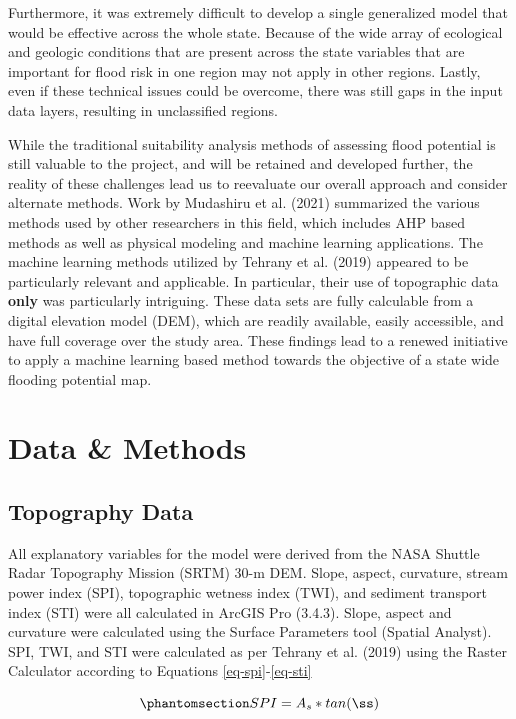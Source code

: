\documentclass[
]{agujournal2019}
\begin{document}
Furthermore, it was extremely difficult to develop a single generalized
model that would be effective across the whole state. Because of the
wide array of ecological and geologic conditions that are present across
the state variables that are important for flood risk in one region may
not apply in other regions. Lastly, even if these technical issues could
be overcome, there was still gaps in the input data layers, resulting in
unclassified regions.

While the traditional suitability analysis methods of assessing flood
potential is still valuable to the project, and will be retained and
developed further, the reality of these challenges lead us to reevaluate
our overall approach and consider alternate methods. Work by Mudashiru
et al. (2021) summarized the various methods used by other researchers
in this field, which includes AHP based methods as well as physical
modeling and machine learning applications. The machine learning methods
utilized by Tehrany et al. (2019) appeared to be particularly relevant
and applicable. In particular, their use of topographic data
\textbf{only} was particularly intriguing. These data sets are fully
calculable from a digital elevation model (DEM), which are readily
available, easily accessible, and have full coverage over the study
area. These findings lead to a renewed initiative to apply a machine
learning based method towards the objective of a state wide flooding
potential map.

\section{Data \& Methods}\label{sec-data-methods}

\subsection{Topography Data}\label{topography-data}

All explanatory variables for the model were derived from the NASA
Shuttle Radar Topography Mission (SRTM) 30-m DEM. Slope, aspect,
curvature, stream power index (SPI), topographic wetness index (TWI),
and sediment transport index (STI) were all calculated in ArcGIS Pro
(3.4.3). Slope, aspect and curvature were calculated using the Surface
Parameters tool (Spatial Analyst). SPI, TWI, and STI were calculated as
per Tehrany et al. (2019) using the Raster Calculator according to
Equations \ref{eq-spi}-\ref{eq-sti}

\begin{equation}\phantomsection\label{eq-spi}{
SPI = A_s * tan(ß)
}\end{equation}
\end{document}
